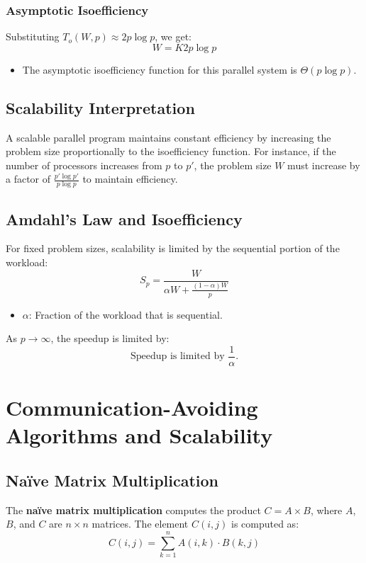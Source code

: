 \documentclass[12pt,a4paper]{article}
\begin{document}
\subsubsection{Asymptotic Isoefficiency}
Substituting $T_o(W, p) \approx 2p \log p$, we get:
\begin{equation}
W = K 2p \log p
\end{equation}
\begin{itemize}
    \item The asymptotic isoefficiency function for this parallel system is $\Theta(p \log p)$.
\end{itemize}

\subsection{Scalability Interpretation}
A scalable parallel program maintains constant efficiency by increasing the problem size proportionally to the isoefficiency function. For instance, if the number of processors increases from $p$ to $p'$, the problem size $W$ must increase by a factor of $\frac{p' \log p'}{p \log p}$ to maintain efficiency.

\subsection{Amdahl's Law and Isoefficiency}
For fixed problem sizes, scalability is limited by the sequential portion of the workload:
\begin{equation}
S_p = \frac{W}{\alpha W + \frac{(1 - \alpha)W}{p}}
\end{equation}
\begin{itemize}
    \item $\alpha$: Fraction of the workload that is sequential.
\end{itemize}
As $p \to \infty$, the speedup is limited by:
\begin{equation}
\text{Speedup is limited by } \frac{1}{\alpha}.
\end{equation}


\section{Communication-Avoiding Algorithms and Scalability}

\subsection{Naïve Matrix Multiplication}
The \textbf{naïve matrix multiplication} computes the product $C = A \times B$, where $A$, $B$, and $C$ are $n \times n$ matrices. The element $C(i,j)$ is computed as:
\[
C(i,j) = \sum_{k=1}^n A(i,k) \cdot B(k,j)
\]
\end{document}
